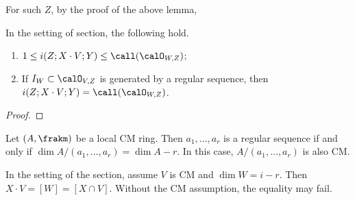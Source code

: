  For such $Z$, by the proof of the above lemma, \Yang{}

  \begin{proposition}
    In the setting of section, the following hold.
    \begin{enumerate}
      \item $1 \leq i(Z; X \cdot V;Y) \leq \call(\calO_{W,Z})$;
      \item If $I_W \subset \calO_{V,Z}$ is generated by a regular sequence, then $i(Z; X \cdot V;Y) = \call(\calO_{W,Z})$.
    \end{enumerate}
  \end{proposition}
  \begin{proof}
    \Yang{}
  \end{proof}

  \begin{lemma}
    Let $(A, \frakm)$ be a local CM ring.
    Then $a_1, \dots, a_r$ is a regular sequence if and only if $\dim A/(a_1, \dots, a_r) = \dim A - r$.
    In this case, $A/(a_1, \dots, a_r)$ is also CM.
  \end{lemma}

  \begin{example}
    In the setting of the section, assume $V$ is CM and $\dim W = i-r$.
    Then $X \cdot V = [W] = [X \cap V]$.
    Without the CM assumption, the equality may fail.
    \Yang{}
  \end{example}

  \begin{example}
    \Yang{}
  \end{example}